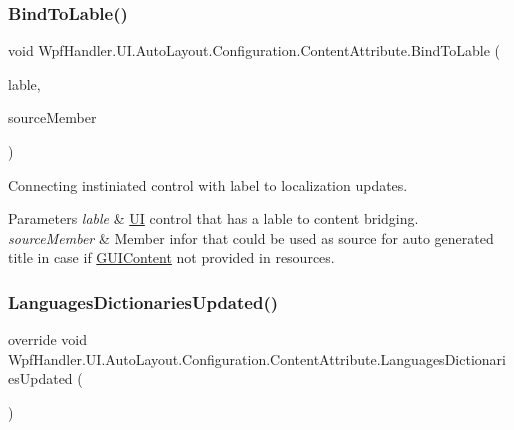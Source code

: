 \subsubsection{\texorpdfstring{Bind\+To\+Lable()}{BindToLable()}\hspace{0.1cm}{\footnotesize\ttfamily [2/2]}}
{\footnotesize\ttfamily void Wpf\+Handler.\+U\+I.\+Auto\+Layout.\+Configuration.\+Content\+Attribute.\+Bind\+To\+Lable (\begin{DoxyParamCaption}\item[{\mbox{\hyperlink{interface_wpf_handler_1_1_u_i_1_1_controls_1_1_i_label}{I\+Label}}}]{lable,  }\item[{Member\+Info}]{source\+Member }\end{DoxyParamCaption})}



Connecting instiniated control with label to localization updates. 


\begin{DoxyParams}{Parameters}
{\em lable} & \mbox{\hyperlink{namespace_wpf_handler_1_1_u_i}{UI}} control that has a lable to content bridging.\\
\hline
{\em source\+Member} & Member infor that could be used as source for auto generated title in case if \mbox{\hyperlink{class_wpf_handler_1_1_u_i_1_1_g_u_i_content}{G\+U\+I\+Content}} not provided in resources.\\
\hline
\end{DoxyParams}
\mbox{\label{class_wpf_handler_1_1_u_i_1_1_auto_layout_1_1_configuration_1_1_content_attribute_a498818bc121b7f408af302eb4085056a}} 
\subsubsection{\texorpdfstring{Languages\+Dictionaries\+Updated()}{LanguagesDictionariesUpdated()}}
{\footnotesize\ttfamily override void Wpf\+Handler.\+U\+I.\+Auto\+Layout.\+Configuration.\+Content\+Attribute.\+Languages\+Dictionaries\+Updated (\begin{DoxyParamCaption}{ }\end{DoxyParamCaption})\hspace{0.3cm}{\ttfamily [virtual]}}



